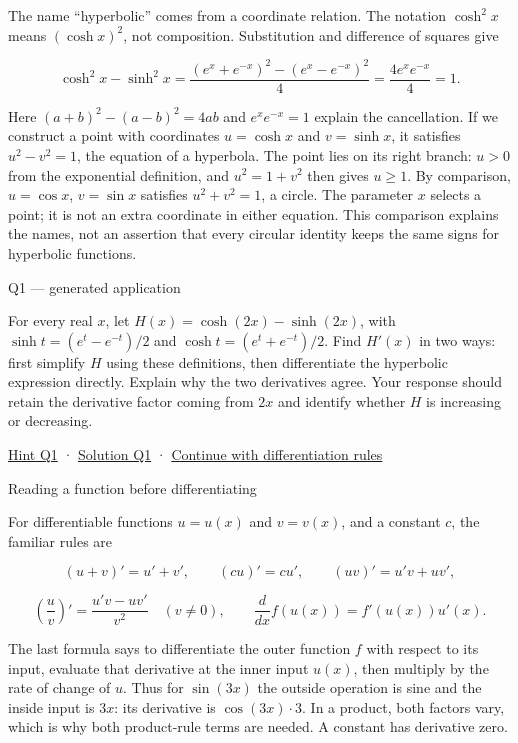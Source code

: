 \documentclass[
  11pt,
]{article}
\providecommand{\gt}{>}
\begin{document}
The name ``hyperbolic'' comes from a coordinate relation. The notation
\(\cosh^2x\) means \((\cosh x)^2\), not composition. Substitution and
difference of squares give

\[\cosh^2x-\sinh^2x
=\frac{(e^x+e^{-x})^2-(e^x-e^{-x})^2}{4}
=\frac{4e^xe^{-x}}4=1.\]

Here \((a+b)^2-(a-b)^2=4ab\) and \(e^xe^{-x}=1\) explain the
cancellation. If we construct a point with coordinates \(u=\cosh x\) and
\(v=\sinh x\), it satisfies \(u^2-v^2=1\), the equation of a hyperbola.
The point lies on its right branch: \(u\gt 0\) from the exponential
definition, and \(u^2=1+v^2\) then gives \(u\ge1\). By comparison,
\(u=\cos x\), \(v=\sin x\) satisfies \(u^2+v^2=1\), a circle. The
parameter \(x\) selects a point; it is not an extra coordinate in either
equation. This comparison explains the names, not an assertion that
every circular identity keeps the same signs for hyperbolic functions.

Q1 --- generated application

For every real \(x\), let \(H(x)=\cosh(2x)-\sinh(2x)\), with
\(\sinh t=(e^t-e^{-t})/2\) and \(\cosh t=(e^t+e^{-t})/2\). Find
\(H'(x)\) in two ways: first simplify \(H\) using these definitions,
then differentiate the hyperbolic expression directly. Explain why the
two derivatives agree. Your response should retain the derivative factor
coming from \(2x\) and identify whether \(H\) is increasing or
decreasing.

\protect\hyperlink{hint-q1}{Hint Q1} ·
\protect\hyperlink{solution-q1}{Solution Q1} ·
\protect\hyperlink{rules}{Continue with differentiation rules}

Reading a function before differentiating

For differentiable functions \(u=u(x)\) and \(v=v(x)\), and a constant
\(c\), the familiar rules are

\[(u+v)'=u'+v',\qquad(cu)'=cu',\qquad(uv)'=u'v+uv',\]

\[\left(\frac uv\right)'=\frac{u'v-uv'}{v^2}\quad(v\ne0),
\qquad
\frac d{dx}f(u(x))=f'(u(x))u'(x).\]

The last formula says to differentiate the outer function \(f\) with
respect to its input, evaluate that derivative at the inner input
\(u(x)\), then multiply by the rate of change of \(u\). Thus for
\(\sin(3x)\) the outside operation is sine and the inside input is
\(3x\): its derivative is \(\cos(3x)\cdot3\). In a product, both factors
vary, which is why both product-rule terms are needed. A constant has
derivative zero.
\end{document}
